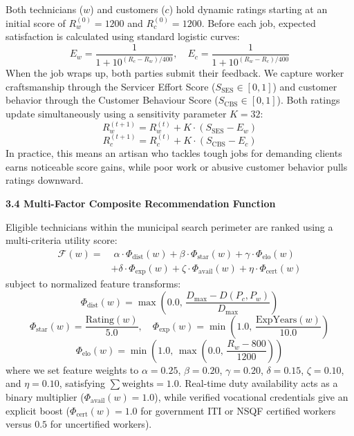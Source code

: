 \documentclass[10pt,twocolumn,a4paper]{article}
\begin{document}
Both technicians ($w$) and customers ($c$) hold dynamic ratings starting at an initial score of $R_w^{(0)} = 1200$ and $R_c^{(0)} = 1200$. Before each job, expected satisfaction is calculated using standard logistic curves:
\begin{equation}
E_w = \frac{1}{1 + 10^{(R_c - R_w)/400}}, \quad E_c = \frac{1}{1 + 10^{(R_w - R_c)/400}}
\end{equation}
When the job wraps up, both parties submit their feedback. We capture worker craftsmanship through the Servicer Effort Score ($S_{\text{SES}} \in [0, 1]$) and customer behavior through the Customer Behaviour Score ($S_{\text{CBS}} \in [0, 1]$). Both ratings update simultaneously using a sensitivity parameter $K = 32$:
\begin{equation}
R_w^{(t+1)} = R_w^{(t)} + K \cdot (S_{\text{SES}} - E_w)
\end{equation}
\begin{equation}
R_c^{(t+1)} = R_c^{(t)} + K \cdot (S_{\text{CBS}} - E_c)
\end{equation}
In practice, this means an artisan who tackles tough jobs for demanding clients earns noticeable score gains, while poor work or abusive customer behavior pulls ratings downward.

\vspace{0.35em}
\noindent
\textbf{3.4 Multi-Factor Composite Recommendation Function}

Eligible technicians within the municipal search perimeter are ranked using a multi-criteria utility score:
\begin{equation}
\begin{aligned}
\mathcal{F}(w) = &\; \alpha \cdot \Phi_{\text{dist}}(w) + \beta \cdot \Phi_{\text{star}}(w) + \gamma \cdot \Phi_{\text{elo}}(w) \\
& + \delta \cdot \Phi_{\text{exp}}(w) + \zeta \cdot \Phi_{\text{avail}}(w) + \eta \cdot \Phi_{\text{cert}}(w)
\end{aligned}
\end{equation}
subject to normalized feature transforms:
\begin{equation}
\Phi_{\text{dist}}(w) = \max\left(0.0, \, \frac{D_{\max} - D(P_c, P_w)}{D_{\max}}\right)
\end{equation}
\begin{equation}
\Phi_{\text{star}}(w) = \frac{\text{Rating}(w)}{5.0}, \quad \Phi_{\text{exp}}(w) = \min\left(1.0, \, \frac{\text{ExpYears}(w)}{10.0}\right)
\end{equation}
\begin{equation}
\Phi_{\text{elo}}(w) = \min\left(1.0, \, \max\left(0.0, \, \frac{R_w - 800}{1200}\right)\right)
\end{equation}
where we set feature weights to $\alpha = 0.25$, $\beta = 0.20$, $\gamma = 0.20$, $\delta = 0.15$, $\zeta = 0.10$, and $\eta = 0.10$, satisfying $\sum \text{weights} = 1.0$. Real-time duty availability acts as a binary multiplier ($\Phi_{\text{avail}}(w) = 1.0$), while verified vocational credentials give an explicit boost ($\Phi_{\text{cert}}(w) = 1.0$ for government ITI or NSQF certified workers versus $0.5$ for uncertified workers).
\end{document}
